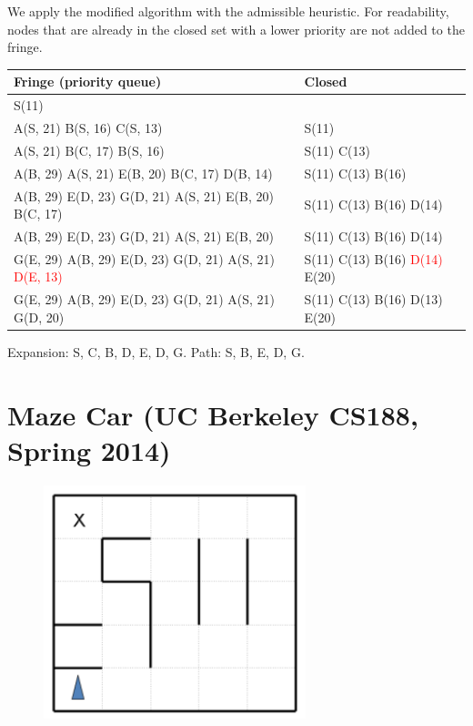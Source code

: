 \documentclass[11pt, a4paper]{article}
\begin{document}
\begin{enumerate}
    \begin{solution}
        We apply the modified algorithm with the admissible heuristic. For readability, nodes that are already in the closed set with a lower priority are not added to the fringe.

        \begin{table}[h]
            \centering
            \begin{tabular}{l|l}
                \toprule
                Fringe (priority queue) & Closed \\
                \midrule
                S(11) & \\
                A(S, 21) B(S, 16) C(S, 13) & S(11) \\
                A(S, 21) B(C, 17) B(S, 16) & S(11) C(13) \\
                A(B, 29) A(S, 21) E(B, 20) B(C, 17) D(B, 14) & S(11) C(13) B(16) \\
                A(B, 29) E(D, 23) G(D, 21) A(S, 21) E(B, 20) B(C, 17) & S(11) C(13) B(16) D(14) \\
                A(B, 29) E(D, 23) G(D, 21) A(S, 21) E(B, 20) & S(11) C(13) B(16) D(14) \\
                G(E, 29) A(B, 29) E(D, 23) G(D, 21) A(S, 21) \textcolor{red}{D(E, 13)} & S(11) C(13) B(16) \textcolor{red}{D(14)} E(20) \\
                G(E, 29) A(B, 29) E(D, 23) G(D, 21) A(S, 21) G(D, 20) & S(11) C(13) B(16) D(13) E(20) \\
                \bottomrule
            \end{tabular}
        \end{table}

        Expansion: S, C, B, D, E, D, G. Path: S, B, E, D, G.
    \end{solution}
\end{enumerate}

\newpage

\section{Maze Car (UC Berkeley CS188, Spring 2014)}

\begin{figure}[h]
    \centering
    \includegraphics[width=0.3\linewidth]{figures/e1_maze.png}
\end{figure}
\end{document}
